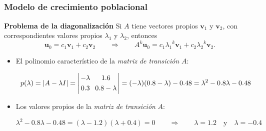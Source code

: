 
\subsection{}

{\nologo
	\begin{frame}\frametitle{Modelo de crecimiento poblacional}
		
		\begin{prop}{\textbf{Problema de la diagonalización}}%
			\justifying
			Si $A$ tiene vectores propios $\mathbf{v}_1$ y $\mathbf{v}_2$, con correspondientes valores propios $\lambda_1$ 
			y $\lambda_2$, entonces
			\[
			\mathbf{u}_0 = c_1\mathbf{v}_1 + c_2\mathbf{v}_2 
			\qquad \Longrightarrow \qquad 
			A^k\mathbf{u}_0 = c_1{\lambda_1}^k\mathbf{v}_1 + c_2{\lambda_2}^k\mathbf{v}_2.
			\]
			
			\vspace{-1mm}
		\end{prop}	
		
		\vspace{2mm}
		\begin{itemize}
			\item El polinomio característico de la \textit{matriz de transición} $A$:
			
			\[	
			p(\lambda)
			=
			|A-\lambda I|
			=
			\left|	
			\begin{array}{@{\hspace{0.2\tabcolsep}}c@{\hspace{1.2\tabcolsep}}c@{\hspace{0.2\tabcolsep}}}
			-\lambda & 1.6 \\[1mm]
			0.3 & 0.8-\lambda
			\end{array}
			\right| 
			=
			(-\lambda)(0.8-\lambda)-0.48
			=
			\lambda^2 - 0.8\lambda - 0.48
			\]
			
			\vspace{4mm}
			\item Los valores propios de la \textit{matriz de transición} $A$:
			
			\[	
			\lambda^2 - 0.8\lambda - 0.48 = (\lambda-1.2)(\lambda+0.4) = 0
			\qquad \Longrightarrow \qquad 
			\lambda=1.2 \quad \text{y} \quad  \lambda=-0.4
			\]
			
		\end{itemize}
		
	\end{frame}
}

